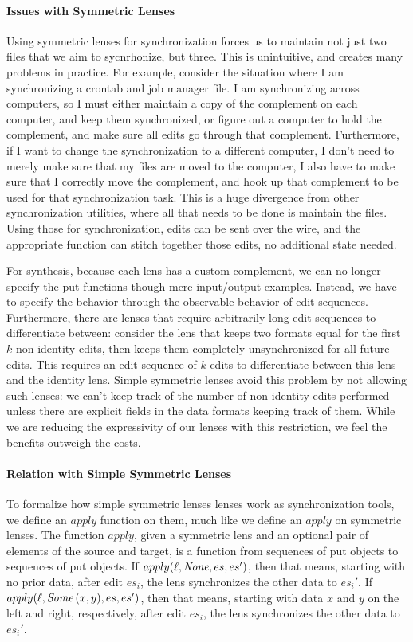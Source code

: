 \documentclass[acmsmall,screen,anonymous]{acmart}
\begin{document}
\paragraph*{Issues with Symmetric Lenses} Using symmetric lenses for
synchronization forces us to maintain not just two files that we aim to
sycnrhonize, but three. This is unintuitive, and creates many problems in
practice. For example, consider the situation where I am synchronizing a crontab
and job manager file. I am synchronizing across computers, so I must either
maintain a copy of the complement on each computer, and keep them synchronized,
or figure out a computer to hold the complement, and make sure all edits go
through that complement. Furthermore, if I want to change the synchronization to
a different computer, I don't need to merely make sure that my files are moved
to the computer, I also have to make sure that I correctly move the complement,
and hook up that complement to be used for that synchronization task. This is a
huge divergence from other synchronization utilities, where all that needs to be
done is maintain the files. Using those for synchronization, edits can be sent
over the wire, and the appropriate function can stitch together those edits, no
additional state needed.

For synthesis, because each lens has a custom complement, we can no longer
specify the put functions though mere input/output examples.  Instead, we have
to specify the behavior through the observable behavior of edit sequences.
Furthermore, there are lenses that require arbitrarily long edit sequences to
differentiate between: consider the lens that keeps two formats equal for the
first $k$ non-identity edits, then keeps them completely unsynchronized for all
future edits.  This requires an edit sequence of $k$ edits to differentiate
between this lens and the identity lens.  Simple symmetric lenses avoid this
problem by not allowing such lenses: we can't keep track of the number of
non-identity edits performed unless there are explicit fields in the data
formats keeping track of them.  While we are reducing the expressivity of our
lenses with this restriction, we feel the benefits outweigh the costs.

\paragraph*{Relation with Simple Symmetric Lenses} To formalize how simple
symmetric lenses lenses work as synchronization tools, we define an $apply$
function on them, much like we define an $apply$ on symmetric lenses. The
function $apply$, given a symmetric lens and an optional pair of elements of the
source and target, is a function from sequences of put objects to sequences of
put objects. If $apply(\mathit{\ell},\mathit{None},es,es')$, then that means, starting with no
prior data, after edit $es_i$, the lens \Lens synchronizes the other data to
$es_i'$. If $apply(\mathit{\ell},\mathit{Some}\,(x,y),es,es')$, then that means, starting with
data $x$ and $y$ on the left and right, respectively, after edit $es_i$, the
lens \Lens synchronizes the other data to $es_i'$.
\end{document}
